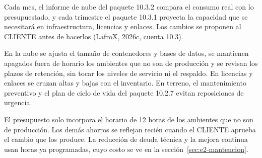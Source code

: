 Cada mes, el informe de nube del paquete 10.3.2 compara el consumo real con lo presupuestado, y cada trimestre el paquete 10.3.1 proyecta la capacidad que se necesitará en infraestructura, licencias y enlaces. Los cambios se proponen al CLIENTE antes de hacerlos (LafroX, 2026c, cuenta 10.3).

En la nube se ajusta el tamaño de contenedores y bases de datos, se mantienen apagados fuera de horario los ambientes que no son de producción y se revisan los plazos de retención, sin tocar los niveles de servicio ni el respaldo. En licencias y enlaces se cruzan altas y bajas con el inventario. En terreno, el mantenimiento preventivo y el plan de ciclo de vida del paquete 10.2.7 evitan reposiciones de urgencia.

El presupuesto solo incorpora el horario de 12 horas de los ambientes que no son de producción. Los demás ahorros se reflejan recién cuando el CLIENTE aprueba el cambio que los produce. La reducción de deuda técnica y la mejora continua usan horas ya programadas, cuyo costo se ve en la sección~\ref{sec:e2-mantencion}.
